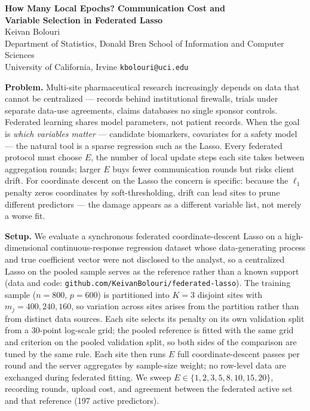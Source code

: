 \documentclass[10pt]{article}
\begin{document}
\enlargethispage{4\baselineskip}

\begin{center}
{\large\bfseries How Many Local Epochs? Communication Cost and\\
Variable Selection in Federated Lasso}\\[0.55em]
Keivan Bolouri\\[0.15em]
{\footnotesize Department of Statistics, Donald Bren School of Information and Computer Sciences\\
University of California, Irvine
\quad\textbullet\quad
\texttt{kbolouri@uci.edu}}
\end{center}

\vspace{0.15em}

\noindent\textbf{Problem.}
Multi-site pharmaceutical research increasingly depends on data that cannot be centralized ---
records behind institutional firewalls, trials under separate data-use agreements, claims databases no single
sponsor controls. Federated learning shares model parameters, not patient records. When the goal is
\textit{which variables matter} --- candidate biomarkers, covariates for a safety model --- the natural tool is a sparse
regression such as the Lasso. Every federated protocol must choose $E$, the number of local update steps
each site takes between aggregation rounds; larger $E$ buys fewer communication rounds but risks client
drift. For coordinate descent on the Lasso the concern is specific: because the $\ell_1$ penalty zeros coordinates
by soft-thresholding, drift can lead sites to prune different predictors --- the damage appears as a different
variable list, not merely a worse fit.

\noindent\textbf{Setup.}
We evaluate a synchronous federated coordinate-descent Lasso on a high-dimensional continuous-response
regression dataset whose data-generating process and true coefficient vector were not disclosed to the
analyst, so a centralized Lasso on the pooled sample serves as the reference rather than a known support
(data and code: \texttt{github.com/KeivanBolouri/federated-lasso}).
The training sample ($n = 800$, $p = 600$) is partitioned into $K = 3$ disjoint sites with
$m_j = 400, 240, 160$, so variation across sites arises from the partition rather than from distinct data
sources. Each site selects its penalty on its own validation split from a 30-point log-scale grid; the pooled
reference is fitted with the same grid and criterion on the pooled validation split, so both sides of the
comparison are tuned by the same rule. Each site then runs $E$ full coordinate-descent passes per round
and the server aggregates by sample-size weight; no row-level data are exchanged during federated fitting.
We sweep $E\in\{1, 2, 3, 5, 8, 10, 15, 20\}$, recording rounds, upload cost, and agreement between the
federated active set and that reference (197 active predictors).
\end{document}
